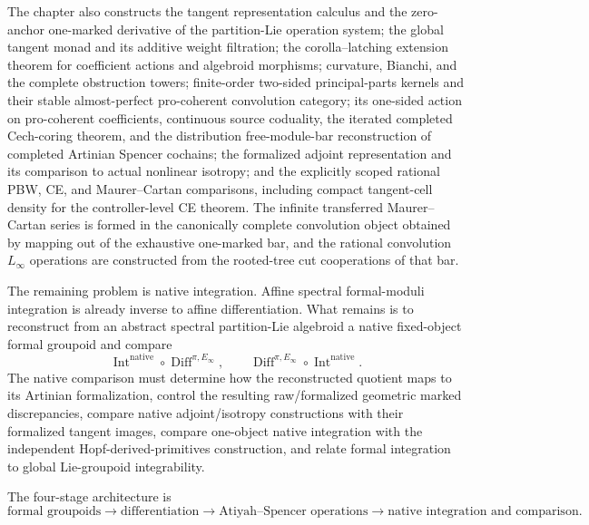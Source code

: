 The chapter also constructs the tangent representation calculus and the
zero-anchor one-marked derivative of the partition-Lie operation system; the
global tangent monad and its additive weight filtration; the corolla--latching
extension theorem for coefficient actions and algebroid morphisms; curvature,
Bianchi, and the complete obstruction towers; finite-order two-sided
principal-parts kernels and their stable almost-perfect pro-coherent
convolution category; its one-sided action on pro-coherent coefficients,
continuous source coduality, the iterated completed Cech-coring theorem, and
the distribution free-module-bar reconstruction of completed Artinian
Spencer cochains; the formalized adjoint representation and its comparison to
actual nonlinear isotropy; and the explicitly scoped rational PBW, CE, and
Maurer--Cartan comparisons, including compact tangent-cell density for the
controller-level CE theorem.  The infinite transferred Maurer--Cartan series is
formed in the canonically complete convolution object obtained by mapping out
of the exhaustive one-marked bar, and the rational convolution $L_\infty$
operations are constructed from the rooted-tree cut cooperations of that bar.

The remaining problem is native integration.  Affine spectral formal-moduli
integration is already inverse to affine differentiation.  What remains is to
reconstruct from an abstract spectral partition-Lie algebroid a native
fixed-object formal groupoid and compare
\[
\boxed{
    \operatorname{Int}^{\mathrm{native}}
    \circ
    \operatorname{Diff}^{\pi,E_\infty},
    \qquad
    \operatorname{Diff}^{\pi,E_\infty}
    \circ
    \operatorname{Int}^{\mathrm{native}}.
}
\]
The native comparison must determine how the reconstructed quotient maps to
its Artinian formalization, control the resulting raw/formalized geometric
marked discrepancies, compare native adjoint/isotropy constructions with
their formalized tangent images, compare one-object native integration with
the independent Hopf-derived-primitives construction, and relate formal
integration to global Lie-groupoid integrability.

The four-stage architecture is
\[
\boxed{
\text{formal groupoids}
\longrightarrow
\text{differentiation}
\longrightarrow
\text{Atiyah--Spencer operations}
\longrightarrow
\text{native integration and comparison}.
}
\]
